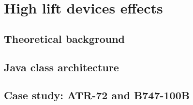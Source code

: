 \chapter{High lift devices effects}
\section{Theoretical background}
\section{Java class architecture}
\section{Case study: ATR-72 and B747-100B}
